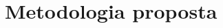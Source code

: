 \documentclass[conference,compsoc]{IEEEtran}
\begin{document}
%
%
%
%
%
%
%
%
 



\section{Metodologia proposta}
\end{document}
